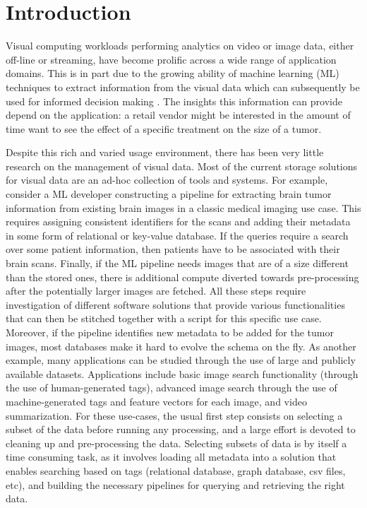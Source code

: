 \section{Introduction}
\label{intro}

Visual computing workloads performing analytics on
video or image data, either off-line or streaming,
have become prolific across a wide range of application domains.
This is in part due to the growing ability of machine learning (ML) techniques to
extract information from the visual data which can subsequently be used
for informed decision making \cite{vdms-nips}.
The insights this information can provide depend on the
application: a retail vendor might be interested in the amount of time
want to see the effect of a specific treatment on the size of a tumor.

Despite this rich and varied usage environment, there has been very little
research on the management of visual data.
Most of the current storage solutions for visual data are
an ad-hoc collection of tools and systems. 
For example, consider a ML developer constructing a pipeline
for extracting brain tumor information from existing brain images in a
classic medical imaging use case. 
This requires assigning consistent
identifiers for the scans and adding their metadata in
some form of relational or key-value database. 
If the queries require a search over some patient information, 
then patients have to be associated with their brain scans. 
Finally, if the ML pipeline needs images that
are of a size different than the stored ones, there is additional compute
diverted towards pre-processing after the potentially larger images are fetched. 
All these steps require investigation of different software
solutions that provide various functionalities that can then be stitched
together with a script for this specific use case.
Moreover, if the pipeline identifies
new metadata to be added for the tumor images, most databases make it
hard to evolve the schema on the fly.
As another example, many applications can be studied through the use of large
and publicly available datasets. 
Applications include basic image search functionality (through the use
of human-generated tags), advanced image search through the use of
machine-generated tags and feature vectors\cite{imagesearch} 
for each image, and video summarization.
For these use-cases, the usual first step consists on selecting a 
subset of the data before running any processing, and a large effort 
is devoted to cleaning up and pre-processing the data.
Selecting subsets of data is by itself a time consuming task,
as it involves loading all metadata into a solution that enables searching
based on tags (relational database, graph database, csv files, etc), and
building the necessary pipelines for querying and retrieving the right data.

